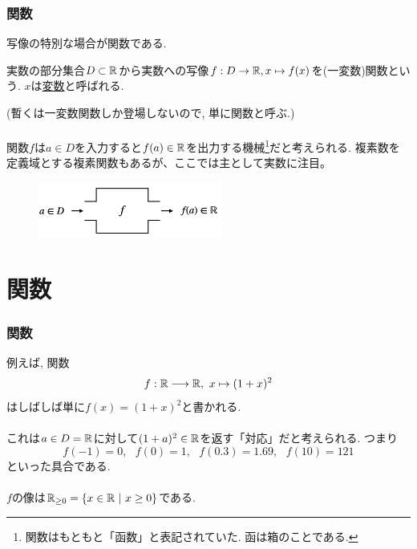 \begin{frame}
\frametitle{関数} 

 写像の特別な場合が関数である. 

\begin{Def}[関数]
実数の部分集合$D \subset \mathbb{R}$から実数への写像$f:D \rightarrow \mathbb{R}, x\mapsto f(x)$を(一変数)関数という. 
$x$は\underline{変数}と呼ばれる. 
\end{Def}
(暫くは一変数関数しか登場しないので, 単に関数と呼ぶ.) \\
\ \\

関数$f$は$a \in D$を入力すると$f(a) \in \mathbb{R}$を出力する機械\footnote{関数はもともと「函数」と表記されていた. 函は箱のことである.}だと考えられる.  複素数を定義域とする複素関数もあるが、ここでは主として実数に注目。

\vspace{-2mm}

 \begin{figure}[htbp]
 \begin{center} 
  \includegraphics[width=60mm]{calculus2/function.png}
 \end{center}
\end{figure}

\vspace{-2mm}

\end{frame}




\section{関数}

\begin{frame}
\frametitle{関数}   



例えば, 関数
$$
f: \R \longrightarrow \R, \ x \mapsto (1+x)^2
$$
はしばしば単に$f(x)=(1+x)^2$と書かれる. \\
\ \\

これは$a \in D=\mathbb{R}$に対して$(1+a)^2 \in \mathbb{R}$を返す「対応」だと考えられる. 
つまり
$$
f(-1)=0, \ \ \ f(0)=1, \ \ \ f(0.3)=1.69, \ \ \ f(10)=121
$$
といった具合である. \\
\ \\

$f$の像は$\mathbb{R}_{\ge 0}=\{x \in \mathbb{R} \ | \ x \ge 0\}$である. 

\end{frame}



